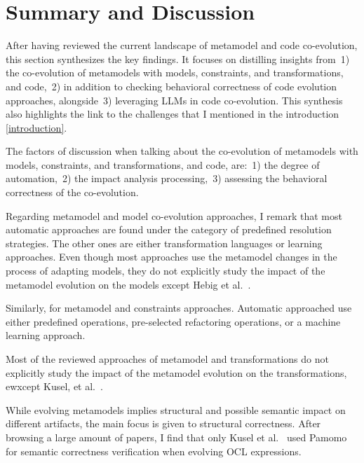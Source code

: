   \section{Summary and Discussion}
  After having reviewed the current landscape of metamodel and code co-evolution, this section synthesizes the key findings. It focuses on distilling insights from~1) the co-evolution of metamodels with models, constraints, and transformations, and code,~2) in addition to checking behavioral correctness of code evolution approaches, alongside~3) leveraging LLMs in code co-evolution. This synthesis also highlights the link to the challenges that I mentioned in the introduction \ref{introduction}.
  
  The factors of discussion when talking about the co-evolution of metamodels with models, constraints, and transformations, and code, are:~1) the degree of automation,~2) the impact analysis processing,~3) assessing the behavioral correctness of the co-evolution.
  
  Regarding metamodel and model co-evolution approaches, I remark that most automatic approaches are found under the category of predefined resolution strategies. The other ones are either transformation languages or learning approaches. Even though most approaches use the metamodel changes in the process of adapting models, they do not explicitly study the impact of the metamodel evolution on the models except Hebig et al.~\cite{hebig2016approaches}.
  
  Similarly, for metamodel and constraints approaches.
  Automatic approached use either predefined operations, pre-selected refactoring operations, or a machine learning approach.
  
 
  Most of the reviewed approaches of metamodel and transformations do not explicitly study the impact of the metamodel evolution on the transformations, ewxcept Kusel, et al.~\cite{kusel2015consistent}.
  
  While evolving metamodels implies structural and possible semantic impact on different artifacts, the main focus is given to structural correctness. After browsing a large amount of papers, I find that only Kusel et al.~\cite{kusel2015systematic} used Pamomo~\cite{10.1007/s10515-012-0102-y} for semantic correctness verification when evolving OCL expressions.
  
